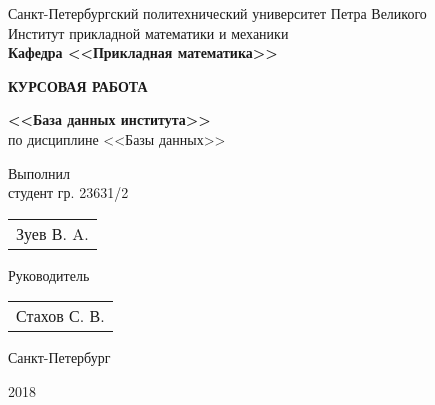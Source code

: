 \documentclass[zuevDbReport.tex]{subfiles}
\begin{document}
\begin{titlepage}
\begin{centering}

Санкт-Петербургский политехнический университет Петра Великого\\
Институт прикладной математики и механики\\

\textbf{Кафедра <<Прикладная математика>>}
\par
\vfill
\vfill

\Large \textbf{КУРСОВАЯ РАБОТА}\\
\normalsize
\par
\textbf {<<База данных института>>}\\
по дисциплине <<Базы данных>>
\vfill

\begin{flushleft}
Выполнил\\
студент гр. 23631/2\\
\end{flushleft}
\hspace{12.5cm}\begin{tabular}{p{}}
Зуев В. A.\\
\end{tabular}
\begin{flushleft}
Руководитель
\end{flushleft}
\hspace{12.5cm}\begin{tabular}{p{}}
Стахов С. В.\\
\end{tabular}
\vfill

Санкт-Петербург
\par
2018

\end{centering}
\end{titlepage}
\end{document}

